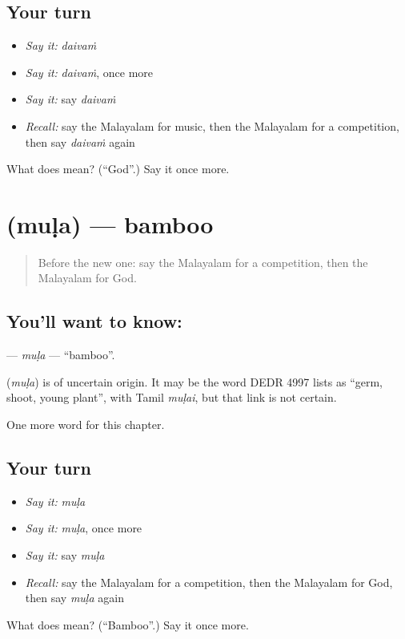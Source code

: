 \subsection*{Your turn}
\begin{itemize}
\raggedright
  \item \emph{Say it:} \emph{daivaṁ}
  \item \emph{Say it:} \emph{daivaṁ}, once more
  \item \emph{Say it:} say \emph{daivaṁ}
  \item \emph{Recall:} say the Malayalam for music, then the Malayalam for a competition, then say \emph{daivaṁ} again
\end{itemize}

\begin{tcolorbox}[breakable,colback=teal!4,colframe=teal!35!black,title={Before you move on}]
What does  mean? (\textquotedblleft{}God\textquotedblright{}.) Say it once more.
\end{tcolorbox}
\section[\texorpdfstring{\ml{മുള} (muḷa)}{മുള (muḷa)}]{ (muḷa) — bamboo}

\label{lesson:ML-C212-mula}



\begin{quote}
Before the new one: say the Malayalam for a competition, then the Malayalam for God.
\end{quote}

\subsection*{You'll want to know: }
\textbf{} — \emph{muḷa} — \textquotedblleft{}bamboo\textquotedblright{}.

\begin{cousinweb}
\textbf{} (\emph{muḷa}) is of uncertain origin. It may be the word DEDR 4997 lists as \textquotedblleft{}germ, shoot, young plant\textquotedblright{}, with Tamil \emph{muḷai}, but that link is not certain.
\end{cousinweb}

\begin{grammarlens}[title={What you've built}]
One more word for this chapter.
\end{grammarlens}

\subsection*{Your turn}
\begin{itemize}
\raggedright
  \item \emph{Say it:} \emph{muḷa}
  \item \emph{Say it:} \emph{muḷa}, once more
  \item \emph{Say it:} say \emph{muḷa}
  \item \emph{Recall:} say the Malayalam for a competition, then the Malayalam for God, then say \emph{muḷa} again
\end{itemize}

\begin{tcolorbox}[breakable,colback=teal!4,colframe=teal!35!black,title={Before you move on}]
What does  mean? (\textquotedblleft{}Bamboo\textquotedblright{}.) Say it once more.
\end{tcolorbox}
